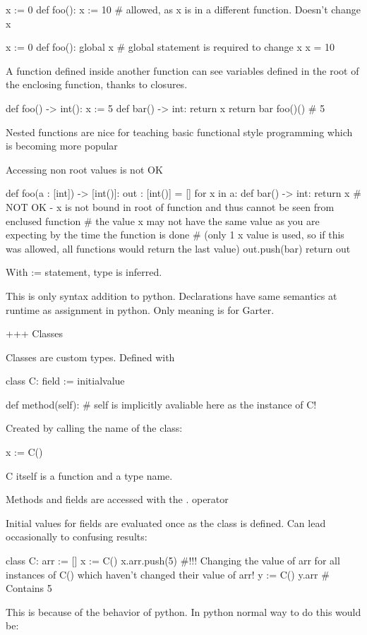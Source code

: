 x := 0
def foo():
    x := 10 # allowed, as x is in a different function. Doesn't change x

x := 0
def foo():
    global x # global statement is required to change x
    x = 10

A function defined inside another function can see variables
defined in the root of the enclosing function, thanks to closures.

def foo() -> int():
    x := 5
    def bar() -> int:
        return x
    return bar
foo()() # 5

Nested functions are nice for teaching basic functional style programming which is becoming more popular

Accessing non root values is not OK

def foo(a : [int]) -> [int()]:
    out : [int()] = []
    for x in a:
        def bar() -> int:
            return x # NOT OK - x is not bound in root of function and thus cannot be seen from enclused function
            # the value x may not have the same value as you are expecting by the time the function is done
            # (only 1 x value is used, so if this was allowed, all functions would return the last value)
        out.push(bar)
    return out

With := statement, type is inferred.

This is only syntax addition to python. Declarations have same semantics at runtime as assignment in python. Only meaning is for Garter.

+++ Classes

Classes are custom types. Defined with

class C:
    field := initialvalue

    def method(self):
        # self is implicitly avaliable here as the instance of C!

Created by calling the name of the class:

x := C()

C itself is a function and a type name.

Methods and fields are accessed with the . operator

Initial values for fields are evaluated once as the class is defined. Can lead occasionally
to confusing results:

class C:
    arr := []
x := C()
x.arr.push(5) #!!! Changing the value of arr for all instances of C() which haven't changed their value of arr!
y := C()
y.arr # Contains 5

This is because of the behavior of python. In python normal way to do this would be:

